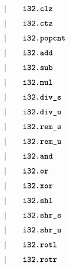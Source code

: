 \begin{alignat*}{9}
    &&       &&\quad | &\quad && \textbf{\texttt{i32.clz}} \quad &&  \\[1mm]
    &&       &&\quad | &\quad && \textbf{\texttt{i32.ctz}} \quad &&  \\[1mm]
    &&       &&\quad | &\quad && \textbf{\texttt{i32.popcnt}} \quad &&  \\[1mm]
    &&       &&\quad | &\quad && \textbf{\texttt{i32.add}} \quad &&  \\[1mm]
    &&       &&\quad | &\quad && \textbf{\texttt{i32.sub}} \quad &&  \\[1mm]
    &&       &&\quad | &\quad && \textbf{\texttt{i32.mul}} \quad &&  \\[1mm]
    &&       &&\quad | &\quad && \textbf{\texttt{i32.div\textunderscore s}} \quad &&  \\[1mm]
    &&       &&\quad | &\quad && \textbf{\texttt{i32.div\textunderscore u}} \quad &&  \\[1mm]
    &&       &&\quad | &\quad && \textbf{\texttt{i32.rem\textunderscore s}} \quad &&  \\[1mm]
    &&       &&\quad | &\quad && \textbf{\texttt{i32.rem\textunderscore u}} \quad &&  \\[1mm]
    &&       &&\quad | &\quad && \textbf{\texttt{i32.and}} \quad &&  \\[1mm]
    &&       &&\quad | &\quad && \textbf{\texttt{i32.or}} \quad &&  \\[1mm]
    &&       &&\quad | &\quad && \textbf{\texttt{i32.xor}} \quad &&  \\[1mm]
    &&       &&\quad | &\quad && \textbf{\texttt{i32.shl}} \quad &&  \\[1mm]
    &&       &&\quad | &\quad && \textbf{\texttt{i32.shr\textunderscore s}} \quad &&  \\[1mm]
    &&       &&\quad | &\quad && \textbf{\texttt{i32.shr\textunderscore u}} \quad &&  \\[1mm]
    &&       &&\quad | &\quad && \textbf{\texttt{i32.rotl}} \quad &&  \\[1mm]
    &&       &&\quad | &\quad && \textbf{\texttt{i32.rotr}} \quad &&  \\[1mm]
\end{alignat*}


